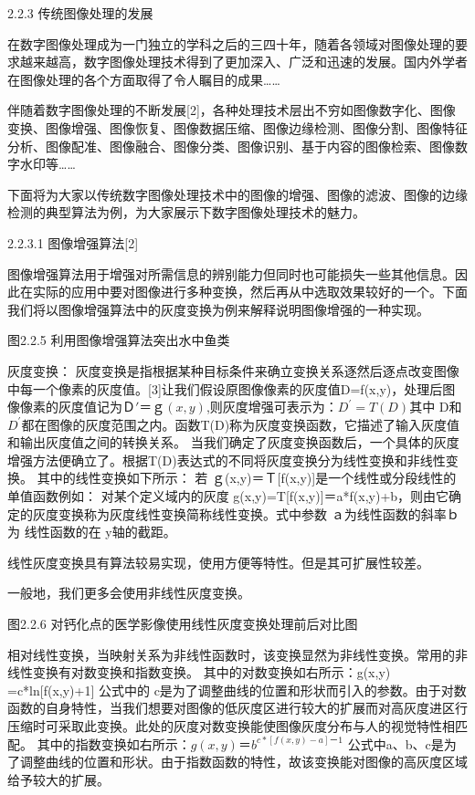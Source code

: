 2.2.3 传统图像处理的发展

	在数字图像处理成为一门独立的学科之后的三四十年，随着各领域对图像处理的要求越来越高，数字图像处理技术得到了更加深入、广泛和迅速的发展。国内外学者在图像处理的各个方面取得了令人瞩目的成果……

	伴随着数字图像处理的不断发展[2]，各种处理技术层出不穷如图像数字化、图像变换、图像增强、图像恢复、图像数据压缩、图像边缘检测、图像分割、图像特征分析、图像配准、图像融合、图像分类、图像识别、基于内容的图像检索、图像数字水印等……

	下面将为大家以传统数字图像处理技术中的图像的增强、图像的滤波、图像的边缘检测的典型算法为例，为大家展示下数字图像处理技术的魅力。
	
2.2.3.1 图像增强算法[2]

图像增强算法用于增强对所需信息的辨别能力但同时也可能损失一些其他信息。因此在实际的应用中要对图像进行多种变换，然后再从中选取效果较好的一个。下面我们将以图像增强算法中的灰度变换为例来解释说明图像增强的一种实现。

图2.2.5 利用图像增强算法突出水中鱼类

灰度变换：
	灰度变换是指根据某种目标条件来确立变换关系逐然后逐点改变图像中每一个像素的灰度值。[3]让我们假设原图像像素的灰度值D=f(x,y)，处理后图像像素的灰度值记为$Ｄ\prime＝ｇ(x,y)$,则灰度增强可表示为：$D^\prime=T(D)$其中 D和 $D^\prime$都在图像的灰度范围之内。函数T(D)称为灰度变换函数，它描述了输入灰度值和输出灰度值之间的转换关系。 当我们确定了灰度变换函数后，一个具体的灰度增强方法便确立了。根据T(D)表达式的不同将灰度变换分为线性变换和非线性变换。
	其中的线性变换如下所示：
	若 ｇ(x,y)＝Ｔ[f(x,y)]是一个线性或分段线性的单值函数例如：
	对某个定义域内的灰度 g(x,y)=T[f(x,y)]＝a*f(x,y)+b，则由它确定的灰度变换称为灰度线性变换简称线性变换。式中参数 ａ为线性函数的斜率ｂ为 线性函数的在 y轴的截距。
	
线性灰度变换具有算法较易实现，使用方便等特性。但是其可扩展性较差。

一般地，我们更多会使用非线性灰度变换。


图2.2.6 对钙化点的医学影像使用线性灰度变换处理前后对比图

相对线性变换，当映射关系为非线性函数时，该变换显然为非线性变换。常用的非线性变换有对数变换和指数变换。
其中的对数变换如右所示：g(x,y) =c*ln[f(x,y)+1] 
公式中的 c是为了调整曲线的位置和形状而引入的参数。由于对数函数的自身特性，当我们想要对图像的低灰度区进行较大的扩展而对高灰度进区行压缩时可采取此变换。此处的灰度对数变换能使图像灰度分布与人的视觉特性相匹配。
其中的指数变换如右所示：$g(x,y) ＝b^ {c*[f(x,y)-a] －1}$
公式中a、b、c是为了调整曲线的位置和形状。由于指数函数的特性，故该变换能对图像的高灰度区域给予较大的扩展。

